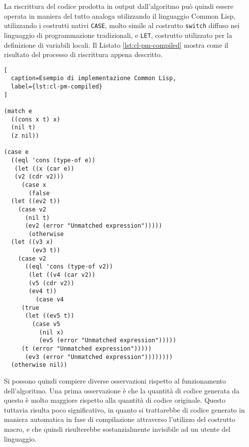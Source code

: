 La riscrittura del codice prodotta in output dall'algoritmo può quindi essere
operata in maniera del tutto analoga utilizzando il linguaggio Common Lisp,
utilizzando i costrutti nativi \texttt{CASE}, molto simile al costrutto
\texttt{switch} diffuso nei linguaggio di programmazione tradizionali, e
\texttt{LET}, costrutto utilizzato per la definizione di variabili locali. Il
Listato \ref{lst:cl-pm-compiled} mostra come il risultato del processo di
riscrittura appena descritto.

\newpage


\begin{lstlisting}[
  caption=Esempio di implementazione Common Lisp,
  label={lst:cl-pm-compiled}
]

(match e
  ((cons x t) x)
  (nil t)
  (z nil))

(case e
  ((eql 'cons (type-of e))
   (let ((x (car e))
   (v2 (cdr v2)))
     (case x
       (false
  (let ((ev2 t))
    (case v2
      (nil t)
      (ev2 (error "Unmatched expression")))))
       (otherwise
  (let ((v3 x)
        (ev3 t))
    (case v2
      ((eql 'cons (type-of v2))
       (let ((v4 (car v2))
       (v5 (cdr v2))
       (ev4 t))
         (case v4
     (true
      (let ((ev5 t))
        (case v5
          (nil x)
          (ev5 (error "Unmatched expression")))))
     (t (error "Unmatched expression")))))
      (ev3 (error "Unmatched expression"))))))))
  (otherwise nil))

\end{lstlisting}

\newpage

Si possono quindi compiere diverse osservazioni rispetto al funzionamento
dell'algoritmo. Una prima osservazione è che la quantità di codice generata da
questo è molto maggiore rispetto alla quantità di codice originale. Questo
tuttavia risulta poco significativo, in quanto si trattarebbe di codice generato
in maniera automatica in fase di compilazione attraverso l'utilizzo del
costrutto macro, e che quindi risulterebbe sostanzialmente invisibile ad un
utente del linguaggio.\\

